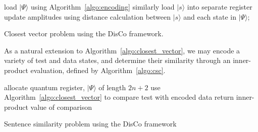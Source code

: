\begin{algorithm}\label{algo:closest_vector}
    load $\vert \Psi \rangle$ using Algorithm~\ref{algo:encoding}\;
    similarly load $ \vert s \rangle$ into separate register\;
    update amplitudes using distance calculation between $\vert s \rangle$ and each state in $\vert \Psi \rangle$;
    \caption{Closest vector problem using the DisCo framework.}
\end{algorithm}

\newpage
As a natural extension to Algorithm~\ref{algo:closest_vector}, we may encode a variety of test and data states, and determine their similarity through an inner-product evaluation, defined by Algorithm~\ref{algo:csc}.

\begin{algorithm}\label{algo:csc}
    allocate quantum register, $\vert \Psi \rangle$ of length $2n+2$\;
    use Algorithm~\ref{algo:closest_vector} to compare test with encoded data\;
    return inner-product value of comparison\;
    \caption{Sentence similarity problem using the DisCo framework}
\end{algorithm}
